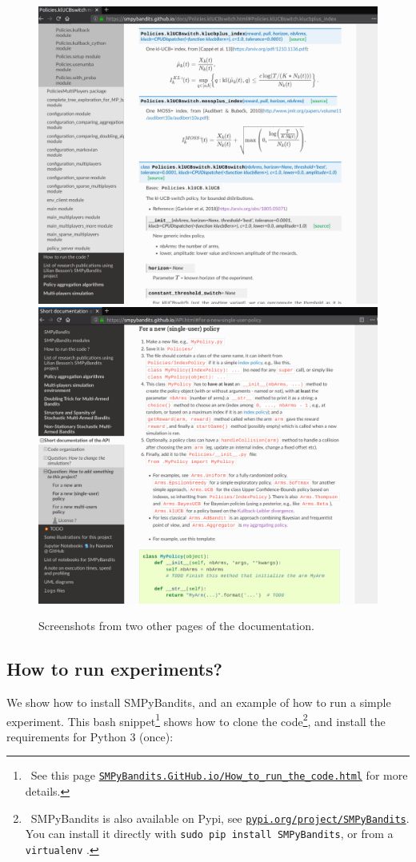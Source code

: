 \begin{figure}[h!]  %
    \centering
	\includegraphics[width=0.49\linewidth]{overview_documentation_3.png}
	\includegraphics[width=0.49\linewidth]{overview_documentation_4.png}
	\caption{Screenshots from two other pages of the documentation.}
	\label{fig:3:twoMoreScreenshotsOfTheDocumentation}
\end{figure}


\subsection{How to run experiments?}

We show how to install SMPyBandits, and an example of how to run a simple experiment.
This bash snippet\footnote{~See this page \texttt{\href{https://SMPyBandits.GitHub.io/How_to_run_the_code.html}{SMPyBandits.GitHub.io/How\_to\_run\_the\_code.html}} for more details.} shows how to clone the code\footnote{~SMPyBandits is also available on Pypi, see \texttt{\href{https://pypi.org/project/SMPyBandits/}{pypi.org/project/SMPyBandits}}. You can install it directly with \texttt{sudo pip install SMPyBandits}, or from a \texttt{virtualenv} \cite{virtualenv}.},
and install the requirements for Python 3 (once):

